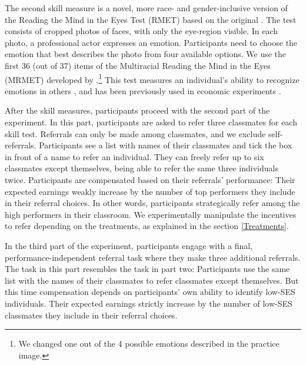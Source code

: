 \documentclass[11pt,a4paper,oneside]{article}
\begin{document}

The second skill measure is a novel, more race- and gender-inclusive version of the Reading the Mind in the Eyes Test (RMET) based on the original \citet{baron-cohen_reading_2001}. The test consists of cropped photos of faces, with only the eye-region visible. In each photo, a professional actor expresses an emotion. Participants need to choose the emotion that best describes the photo from four available options. We use the first 36 (out of 37) items of the Multiracial Reading the Mind in the Eyes (MRMET) developed by \citet{kim_multiracial_2022}.\footnote{We changed one out of the 4 possible emotions described in the practice image.} This test measures an individual's ability to recognize emotions in others \citep{oakley_theory_2016}, and has been previously used in economic experiments \citep{reuben_can_2009,weidmann_team_2021,van_leeuwen_predictably_2018}.  

After the skill measures, participants proceed with the second part of the experiment. In this part, participants are asked to refer three classmates for each skill test. Referrals can only be made among classmates, and we exclude self-referrals. Participants see a list with names of their classmates and tick the box in front of a name to refer an individual. They can freely refer up to six classmates except themselves, being able to refer the same three individuals twice. Participants are compensated based on their referrals' performance: Their expected earnings weakly increase by the number of top performers they include in their  referral choices. In other words, participants strategically refer among the high performers in their classroom. We experimentally manipulate the incentives to refer depending on the treatments, as explained in the section \ref{Treatments}.

In the third part of the experiment, participants engage with a final, performance-independent referral task where they make three additional referrals. The task in this part resembles the task in part two: Participants use the same list with the names of their classmates to refer classmates except themselves. But this time compensation depends on participants' own ability to identify low-SES individuals. Their expected earnings strictly increase by the number of low-SES classmates they include in their referral choices.   
\end{document}
